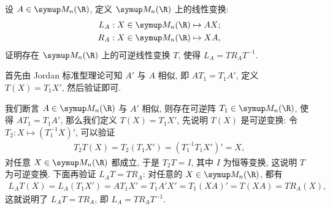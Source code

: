 \begin{exercise}[resume=exer]
      \item 设 $ A \in \MM $, 定义 $ \MM $ 上的线性变换:
      \begin{align*}
          L_{A} : X \in \MM \mapsto AX;\\
          R_{A} : X \in \MM \mapsto XA,
      \end{align*}
      证明存在 $ \MM $ 上的可逆线性变换 $ T $, 使得 $ L_{A} = TR_{A}T^{-1} $.
      \begin{hint}
          首先由 Jordan 标准型理论可知 $ A' $ 与 $ A $ 相似, 即 $ AT_{1} = T_{1}A' $, 定义 $ T(X) = T_{1}X' $, 然后验证即可.
      \end{hint}
      \begin{answer}
          我们断言 $ A \in \MM $ 与 $ A' $ 相似, 则存在可逆阵 $ T_{1} \in \MM $, 使得 $ AT_{1} = T_{1}A' $, 那么我们定义 $ T(X) = T_{1}X' $, 先说明 $ T(X) $ 是可逆变换: 令 $ T_{2} : X \mapsto (T^{-1}_{1}X)' $, 可以验证
          \begin{align*}
              T_{2}T(X) = T_{2}(T_{1}X') = (T_{1}^{-1}T_{1}X')' = X,
          \end{align*}
          对任意 $ X \in \MM $ 都成立, 于是 $ T_{2}T = I $, 其中 $ I $ 为恒等变换, 这说明 $ T $ 为可逆变换. 下面再验证 $ L_{A}T = TR_{A} $: 对任意的 $ X \in \MM $, 都有
          \begin{align*}
              L_{A}T(X) = L_{A}(T_{1}X') = AT_{1}X' = T_{1}A'X' = T_{1}(XA)' = T(XA) = TR_{A}(X),
          \end{align*}
          这就说明了 $ L_{A}T = TR_{A} $, 即 $ L_{A} = TR_{A}T^{-1} $.


\end{answer}
\end{exercise}
